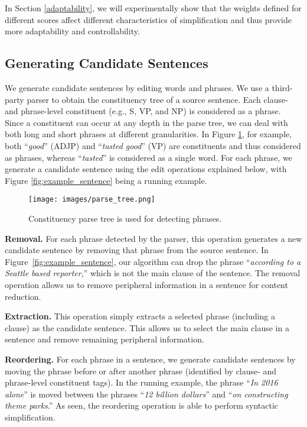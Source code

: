 \documentclass[11pt,a4paper]{article}
\begin{document}
In Section \ref{adaptability}, we will experimentally show that the weights defined for different scores affect different characteristics of simplification and thus provide more adaptability and controllability.

\subsection{Generating Candidate Sentences}
\label{subsec:candidates}




We generate candidate sentences by editing words and phrases. We use a third-party parser to obtain the constituency tree of a source sentence. Each clause- and phrase-level constituent (e.g., S, VP, and NP) is considered as a phrase. 
Since a constituent can occur at any depth in the parse tree, we can deal with both long and short phrases at different granularities. In Figure \ref{fig:example_parsetree}, for example, both  ``\textit{good}'' (ADJP) and ``\textit{tasted good}'' (VP) are constituents and thus considered as phrases, whereas ``\textit{tasted}'' is considered as a single word. 
For each phrase, we generate a candidate sentence using the edit operations explained below, with Figure \ref{fig:example_sentence} being a running example.
\begin{figure}\centering
  \texttt{[image: images/parse\_tree.png]}\vspace{-.2cm}
  \caption{Constituency parse tree is used for detecting phrases.}\vspace{-.2cm}
  \label{fig:example_parsetree}
\end{figure}



\textbf{Removal.}
For each phrase detected by the parser, this operation generates a new candidate sentence by removing that phrase from the source sentence. In Figure~\ref{fig:example_sentence}, our algorithm can drop the phrase
``\textit{according to a Seattle based reporter},'' which is not the main clause of the sentence. The removal operation allows us to remove peripheral information in a sentence for content reduction. 

\textbf{Extraction.}
This operation simply extracts a selected phrase (including a clause) as the candidate sentence. This allows us to select the main clause in a sentence and remove remaining peripheral information.

\textbf{Reordering.}
For each phrase in a sentence, we generate candidate sentences by moving the phrase before or after another phrase (identified by clause- and phrase-level constituent tags).
In the running example, the phrase ``\textit{In 2016 alone}'' is moved between the phrases ``\textit{12 billion dollars}'' and ``\textit{on constructing theme parks}.''
As seen, the reordering operation is able to perform syntactic simplification.
\end{document}
